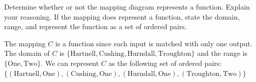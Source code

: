 \documentclass{ximera}
\begin{document}
\begin{problem}\label{mappinglast}
Determine whether or not the mapping diagram represents a function. Explain your reasoning. If the mapping does represent a function, state the domain, range, and represent the function as a set of ordered pairs.


\begin{solution}
The mapping $C$ is a function since each input is matched with only one output.  The domain of $C$ is $\{ \text{Hartnell}, \text{Cushing}, \text{Hurndall}, \text{Troughton} \}$ and the range is $\{\text{One}, \text{Two} \}$.  We can represent $C$ as the following set of ordered pairs:  $\{ (\text{Hartnell}, \text{One}), (\text{Cushing}, \text{One}),  (\text{Hurndall}, \text{One}), (\text{Troughton}, \text{Two}) \}$
\end{solution}
\end{problem} 
\end{document}
